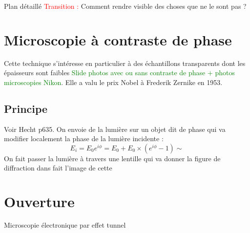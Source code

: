 \begin{reportBlock}{Plan détaillé}
  \textcolor{red}{Transition :} Comment rendre visible des choses que ne le sont pas ?
  
\section{Microscopie à contraste de phase}
Cette technique s'intéresse en particulier à des échantillons transparents dont les épaisseurs sont faibles \textcolor{green}{Slide photos avec ou sans contraste de phase + photos microscopies Nikon}. Elle a valu le prix Nobel à Frederik Zernike en 1953.
\subsection{Principe}
Voir Hecht p635. On envoie de la lumière sur un objet dit de phase qui va modifier localement la phase de la lumière incidente :
\begin{equation}
    E_i = E_0e^{i\phi} = E_0 + E_0\times(e^{i\phi}-1) \sim 
\end{equation}
On fait passer la lumière à travers une lentille qui va donner la figure de diffraction dans fait l'image de cette 


\section*{Ouverture}
Microscopie électronique par effet tunnel

\end{reportBlock}